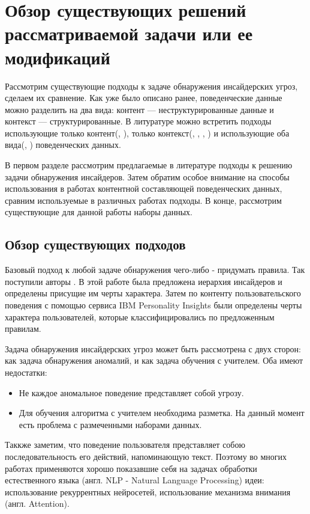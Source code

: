 \section{Обзор существующих решений рассматриваемой зада­чи или ее модификаций}
Рассмотрим существующие подходы к задаче обнаружения инсайдерских угроз, сделаем их сравнение. Как уже было описано ранее, поведенческие данные можно разделить на два вида: контент --- неструктурированные данные и контекст --- структурированные. В литуратуре можно встретить подходы использующие только контент(\cite{rules}, \cite{absa}), только контекст(\cite{lac}, \cite{granual}, \cite{lstm_cnn}, \cite{gru}) и использующие оба вида(\cite{anomalyalgo}, \cite{suites}) поведенческих данных.

В первом разделе рассмотрим предлагаемые в литературе подходы к решению задачи обнаружения инсайдеров. Затем обратим особое внимание на способы использования в работах контентной составляющей поведенческих данных, сравним используемые в различных работах подходы. В конце, рассмотрим существующие для данной работы наборы данных.
\subsection{Обзор существующих подходов}

Базовый подход к любой задаче обнаружения чего-либо - придумать правила. Так поступили авторы \cite{rules}. В этой работе была предложена иерархия инсайдеров и определены присущие им черты характера. Затем по контенту пользовательского поведения с помощью сервиса IBM Personality Insights были определены черты характера пользователей, которые классифицировались по предложенным правилам. 

Задача обнаружения инсайдерских угроз может быть рассмотрена с двух сторон: как задача обнаружения аномалий, и как задача обучения с учителем. Оба имеют недостатки: 
\begin{itemize}
\item Не каждое аномальное поведение представляет собой угрозу. 
\item Для обучения алгоритма с учителем необходима разметка. На данный момент есть проблема с размеченными наборами данных. 
\end{itemize}

Таккже заметим, что поведение пользователя представляет собою последовательность его действий, напоминающую текст. Поэтому во многих работах применяются хорошо показавшие себя на задачах обработки естественного языка (англ. NLP - Natural Language Processing) идеи: использование рекуррентных нейросетей, использование механизма внимания (англ. Attention).  

